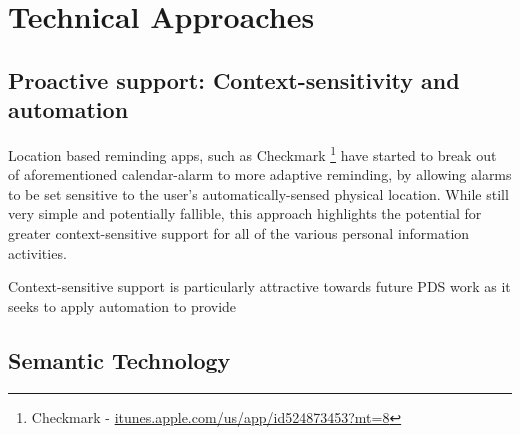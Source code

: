 \documentclass[runningheads,a4paper]{llncs}
\begin{document}
\section{Technical Approaches}

\subsection{Proactive support: Context-sensitivity and automation}
Location based reminding apps, such as Checkmark \footnote{Checkmark - \url{itunes.apple.com/us/app/id524873453?mt=8}} have started to break out of aforementioned calendar-alarm to more adaptive reminding, by allowing alarms to be set sensitive to the user's automatically-sensed physical location.  While still very simple and potentially fallible, this approach highlights the potential for greater context-sensitive support for all of the various personal information activities.  

Context-sensitive support is particularly attractive towards future PDS work as it seeks to apply automation to provide

\subsection{Semantic Technology}




\end{document}
